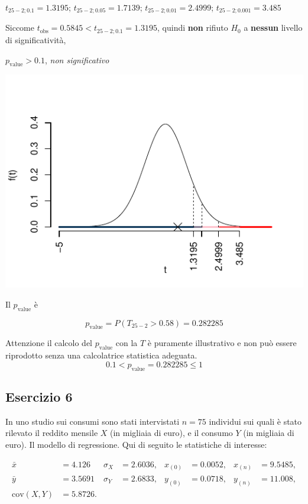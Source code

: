 \documentclass[
  11pt,
]{book}
\theoremstyle{mytheoremstyle}
\theoremstyle{mydefstyle}
\newenvironment{sol}
  {
  \begin{tcolorbox}[enhanced,breakable,arc=0.1mm,boxrule=1pt,colback=white,colframe=iblue,
  title=\bf \fontfamily{lmss}\selectfont \hspace{.5 cm} Soluzione,drop fuzzy shadow]

}{
\end{tcolorbox}
  }
\begin{document}
\begin{sol}
\(t_{25-2;0.1}=1.3195\); \(t_{25-2;0.05}=1.7139\); \(t_{25-2;0.01}=2.4999\); \(t_{25-2;0.001}=3.485\)

Siccome \(t_\text{obs}=0.5845<t_{25-2;0.1}=1.3195\), quindi \textbf{non} rifiuto \(H_0\) a \textbf{nessun} livello di significatività,

\(p_\text{value}>0.1\), \emph{non significativo}

\begin{center}\includegraphics{Esami_passati_con_soluzioni_files/figure-latex/2021-16,-1} \end{center}

Il \(p_{\text{value}}\) è

\[ p_{\text{value}} = P(T_{25-2}>0.58)=0.282285 \]

Attenzione il calcolo del \(p_\text{value}\) con la \(T\) è puramente illustrativo e non può essere riprodotto senza una calcolatrice statistica adeguata.\[
 0.1 < p_\text{value}= 0.282285 \leq 1 
\]

\end{sol}

\subsection{Esercizio 6}\label{esercizio-6-3}

In uno studio sui consumi sono stati intervistati \(n=75\) individui
sui quali è stato rilevato il reddito mensile \(X\) (in migliaia di euro), e il consumo \(Y\) (in migliaia di euro). Il modello di regressione. Qui di seguito le statistiche di interesse:

\begin{align*}
\bar x&=4.126 &\hat \sigma_X&=2.6036, &x_{(0)}&=0.0052,  &x_{(n)}&=9.5485,\\
\bar y&=3.5691 &\hat \sigma_Y&=2.6833, &y_{(0)}&=0.0718,  &y_{(n)}&=11.008,\\
\text{cov}(X,Y)&=5.8726.
\end{align*}
\end{document}
